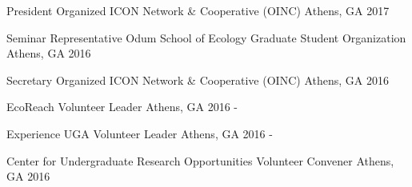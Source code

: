 

\begin{cvhonors}
\cvhonor
    {President} %
    {Organized ICON Network \& Cooperative (OINC)} %
    {Athens, GA} %
    {2017} %

\cvhonor
    {Seminar Representative} %
    {Odum School of Ecology Graduate Student Organization} %
    {Athens, GA} %
    {2016} %

\cvhonor
    {Secretary} %
    {Organized ICON Network \& Cooperative (OINC)} %
    {Athens, GA} %
    {2016} %

\end{cvhonors}


\begin{cvhonors}


    \cvhonor
      {EcoReach}
      {Volunteer Leader}
      {Athens, GA}
      {2016 - }

    \cvhonor
      {Experience UGA}
      {Volunteer Leader}
      {Athens, GA}
      {2016 - }

    \cvhonor
      {Center for Undergraduate Research Opportunities} %
      {Volunteer Convener} %
      {Athens, GA} %
      {2016} %
\end{cvhonors}

